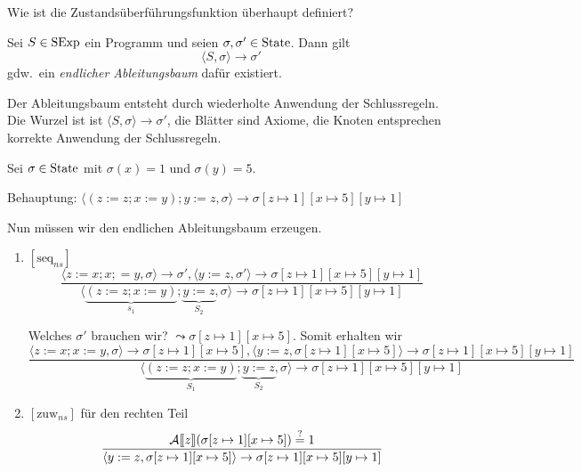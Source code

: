 \par\bigskip
\par\bigskip
Wie ist die Zustandsüberführungsfunktion überhaupt definiert?

\begin{definition}
    Sei $S \in \operatorname{SExp}$ ein Programm und seien $\sigma, \sigma' \in \operatorname{State}$. Dann gilt
    \[
    \langle S, \sigma \rangle \to \sigma'
    \]
    gdw.\ ein \emph{endlicher Ableitungsbaum} dafür existiert.

    Der Ableitungsbaum entsteht durch wiederholte Anwendung der Schlussregeln. Die Wurzel ist ist $\langle S, \sigma \rangle \to \sigma'$, die Blätter sind Axiome, die Knoten entsprechen  korrekte Anwendung der Schlussregeln.
\end{definition}

\begin{example}
    Sei $\sigma \in \operatorname{State}$ mit $\sigma(x) = 1$ und $\sigma(y) = 5$.

    Behauptung: $\langle (z := z; x := y); y := z, \sigma \rangle \to \sigma[z \mapsto 1][x \mapsto 5][y \mapsto 1]$

    Nun müssen wir den endlichen Ableitungsbaum erzeugen.


    \begin{enumerate}
        \item $[\text{seq}_{ns}]$
            \[
            \frac{\langle z := x; x ;= y, \sigma \rangle \to \sigma', \langle y := z, \sigma' \rangle \to \sigma[z \mapsto 1][x \mapsto 5][y \mapsto 1]}{\langle \underbrace{(z := z; x := y)}_{s_1}; \underbrace{y := z}_{S_2}, \sigma \rangle \to \sigma[z \mapsto 1][x \mapsto 5][y \mapsto 1]}
            \]

            Welches $\sigma'$ brauchen wir? $\leadsto \sigma[z \mapsto 1][x \mapsto 5]$. Somit erhalten wir
            \[
            \frac{\langle z := x; x := y, \sigma \rangle \to \sigma[z \mapsto 1][x \mapsto 5], \langle y := z, \sigma[z \mapsto 1][x \mapsto 5] \rangle \to \sigma[z \mapsto 1][x \mapsto 5][y \mapsto 1]}{\langle \underbrace{(z := z; x := y)}_{S_1}; \underbrace{y := z}_{S_2}, \sigma \rangle \to \sigma[z \mapsto 1][x \mapsto 5][y \mapsto 1]}
            \]

        \item $[\text{zuw}_{ns}]$ für den rechten Teil
            \[
            \frac{\mathcal{A}\mathrm{[}\kern-.14em\mathrm{[} z\mathrm{]}\kern-.14em\mathrm{]}(\sigma[z \mapsto 1][x \mapsto 5]) \overset{?}{=} 1}{\langle y := z, \sigma[z \mapsto 1][x \mapsto 5] \rangle \to \sigma[z \mapsto 1][x \mapsto 5][y \mapsto 1]}
            \]


\end{enumerate}
\end{example}
